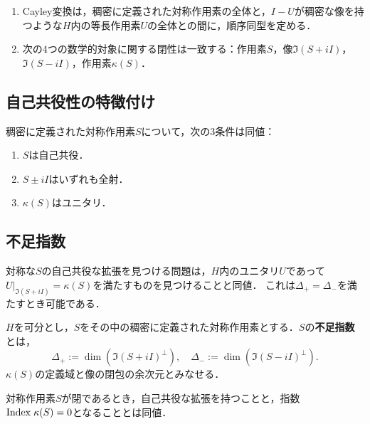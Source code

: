 \documentclass[uplatex,dvipdfmx]{jsreport}
\begin{document}
\begin{theorem}\mbox{}
    \begin{enumerate}
        \item Cayley変換は，稠密に定義された対称作用素の全体と，$I-U$が稠密な像を持つような$H$内の等長作用素$U$の全体との間に，順序同型を定める．
        \item 次の4つの数学的対象に関する閉性は一致する：作用素$S$，像$\Im(S+iI)$，$\Im(S-iI)$，作用素$\kappa(S)$．
    \end{enumerate}
\end{theorem}

\subsection{自己共役性の特徴付け}

\begin{proposition}
    稠密に定義された対称作用素$S$について，次の3条件は同値：
    \begin{enumerate}
        \item $S$は自己共役．
        \item $S\pm iI$はいずれも全射．
        \item $\kappa(S)$はユニタリ．
    \end{enumerate}
\end{proposition}

\subsection{不足指数}

\begin{tcolorbox}[colframe=ForestGreen, colback=ForestGreen!10!white,breakable,colbacktitle=ForestGreen!40!white,coltitle=black,fonttitle=\bfseries\sffamily,
title=]
    対称な$S$の自己共役な拡張を見つける問題は，$H$内のユニタリ$U$であって$U|_{\Im(S+iI)}=\kappa(S)$を満たすものを見つけることと同値．
    これは$\Delta_+=\Delta_-$を満たすとき可能である．
\end{tcolorbox}

\begin{definition}
    $H$を可分とし，$S$をその中の稠密に定義された対称作用素とする．$S$の\textbf{不足指数}とは，
    \[\Delta_+:=\dim(\Im(S+iI)^\perp),\quad\Delta_-:=\dim(\Im(S-iI)^\perp).\]
    $\kappa(S)$の定義域と像の閉包の余次元とみなせる．
\end{definition}

\begin{lemma}
    対称作用素$S$が閉であるとき，自己共役な拡張を持つことと，指数$\mathrm{Index}\;\kappa(S)=0$となることとは同値．
\end{lemma}
\end{document}
